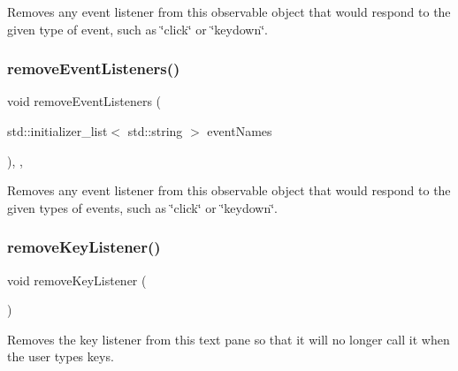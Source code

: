 Removes any event listener from this observable object that would respond to the given type of event, such as \char`\"{}click\char`\"{} or \char`\"{}keydown\char`\"{}. 

\mbox{\label{classGObservable_af51cc35c29a1bd1908609d432decdbb6}} 
\subsubsection{\texorpdfstring{remove\+Event\+Listeners()}{removeEventListeners()}}
{\footnotesize\ttfamily void remove\+Event\+Listeners (\begin{DoxyParamCaption}\item[{std\+::initializer\+\_\+list$<$ std\+::string $>$}]{event\+Names }\end{DoxyParamCaption})\hspace{0.3cm}{\ttfamily [protected]}, {\ttfamily [virtual]}, {\ttfamily [inherited]}}



Removes any event listener from this observable object that would respond to the given types of events, such as \char`\"{}click\char`\"{} or \char`\"{}keydown\char`\"{}. 

\mbox{\label{classGBrowserPane_a43095f41cab3be732b49f29970484b05}} 
\subsubsection{\texorpdfstring{remove\+Key\+Listener()}{removeKeyListener()}}
{\footnotesize\ttfamily void remove\+Key\+Listener (\begin{DoxyParamCaption}{ }\end{DoxyParamCaption})\hspace{0.3cm}{\ttfamily [virtual]}}



Removes the key listener from this text pane so that it will no longer call it when the user types keys. 

\mbox{\label{classGBrowserPane_a263a2282597ca9f0f73301fb202ae390}} 
